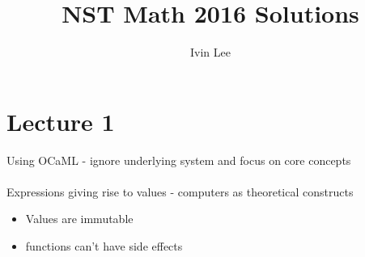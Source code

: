 \documentclass[12pt,a4paper]{article} %
\author{Ivin Lee}
\title{NST Math 2016 Solutions}
\begin{document}
\section{Lecture 1}
Using OCaML - ignore underlying system and focus on core concepts
\\\\
Expressions giving rise to values - computers as theoretical constructs
\begin{itemize}
\item Values are immutable
\item functions can't have side effects
\end{itemize}
\end{document}
